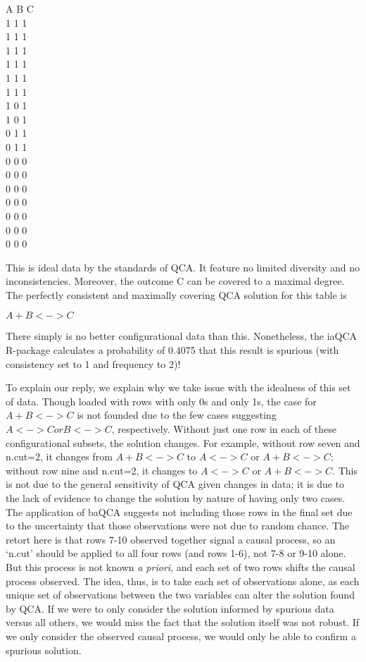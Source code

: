 \documentclass[10pt,stdletter,dateno,sigleft]{newlfm} %
\begin{document}
\begin{newlfm}
\begin{displayquote}
\begin{center}
A B C \\
1 1 1 \\
1 1 1\\
1 1 1\\
1 1 1\\
1 1 1\\
1 1 1\\
1 0 1\\
1 0 1\\
0 1 1\\
0 1 1\\
0 0 0\\
0 0 0\\
0 0 0\\
0 0 0\\
0 0 0\\
0 0 0\\
0 0 0\\
\end{center}

This is ideal data by the standards of QCA. It feature no limited diversity and no inconsistencies. Moreover, the outcome C can be covered to a maximal degree. The perfectly consistent and maximally covering QCA solution for this table is

\begin{center}
$A + B <-> C$
\end{center}

There simply is no better configurational data than this. Nonetheless, the iaQCA R-package calculates a probability of 0.4075 that this result is spurious (with consistency set to 1 and frequency to 2)!
\end{displayquote}


To explain our reply, we explain why we take issue with the idealness of this set of data. Though loaded with rows with only 0s and only 1s, the case for $A + B <-> C$ is not founded due to the few cases suggesting $A <-> C or B <-> C$, respectively. Without just one row in each of these configurational subsets, the solution changes. For example, without row seven and n.cut=2, it changes from $A + B <-> C$ to  $A <-> C$ or $A + B <-> C$; without row nine and n.cut=2, it changes to $A <-> C$ or $A + B <-> C$. This is not due to the general sensitivity of QCA given changes in data; it is due to the lack of evidence to change the solution by nature of having only two cases. The application of baQCA suggests not including those rows in the final set due to the uncertainty that those observations were not due to random chance. The retort here is that rows 7-10 observed together signal a causal process, so an `n.cut' should be applied to all four rows (and rows 1-6), not 7-8 or 9-10 alone. But this process is not known {\it{a priori}}, and each set of two rows shifts the causal process observed. The idea, thus, is to take each set of observations alone, as each unique set of observations between the two variables can alter the solution found by QCA. If we were to only consider the solution informed by spurious data versus all others, we would miss the fact that the solution itself was not robust. If we only consider the observed causal process, we would only be able to confirm a spurious solution.


\end{newlfm}
\end{document}
